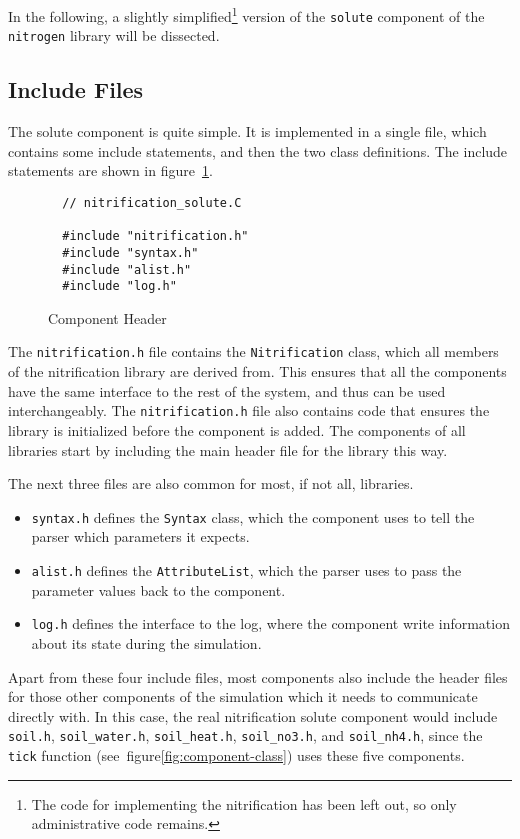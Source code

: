 \documentclass{article}
\newcommand{\code}[1]{\texttt{#1}}
\newcommand{\file}[1]{\texttt{#1}}
\begin{document}
In the following, a slightly simplified\footnote{The code for
  implementing the nitrification has been left out, so only
  administrative code remains.} version of the \code{solute} component
of the \code{nitrogen} library will be dissected.

\subsection{Include Files}

The solute component is quite simple.  It is implemented in a single
file, which contains some include statements, and then the two class
definitions.  The include statements are shown in
figure~\ref{fig:component-header}. 

\begin{figure}[htbp]
\begin{verbatim}
  // nitrification_solute.C
  
  #include "nitrification.h"
  #include "syntax.h"
  #include "alist.h"
  #include "log.h"
\end{verbatim}
  \caption{Component Header}
  \label{fig:component-header}
\end{figure}

The \file{nitrification.h} file contains the \code{Nitrification} class,
which all members of the nitrification library are derived from.  This
ensures that all the components have the same interface to the rest of
the system, and thus can be used interchangeably.  The
\file{nitrification.h} file also contains code that ensures the
library is initialized before the component is added.  The components
of all libraries start by including the main header file for the
library this way.

The next three files are also common for most, if not all, libraries.
\begin{itemize}
\item \file{syntax.h} defines the \code{Syntax} class, which the
  component uses to tell the parser which parameters it expects.
\item \file{alist.h} defines the \code{AttributeList}, which the
  parser uses to pass the parameter values back to the component. 
\item \file{log.h} defines the interface to the log, where the
  component write information about its state during the simulation.
\end{itemize}

Apart from these four include files, most components also include the
header files for those other components of the simulation which it
needs to communicate directly with.  In this case, the real
nitrification solute component would include \file{soil.h},
\file{soil\_water.h}, \file{soil\_heat.h}, \file{soil\_no3.h}, and
\file{soil\_nh4.h}, since the \code{tick} function
(see~figure\ref{fig:component-class}) uses these five components.
\end{document}
